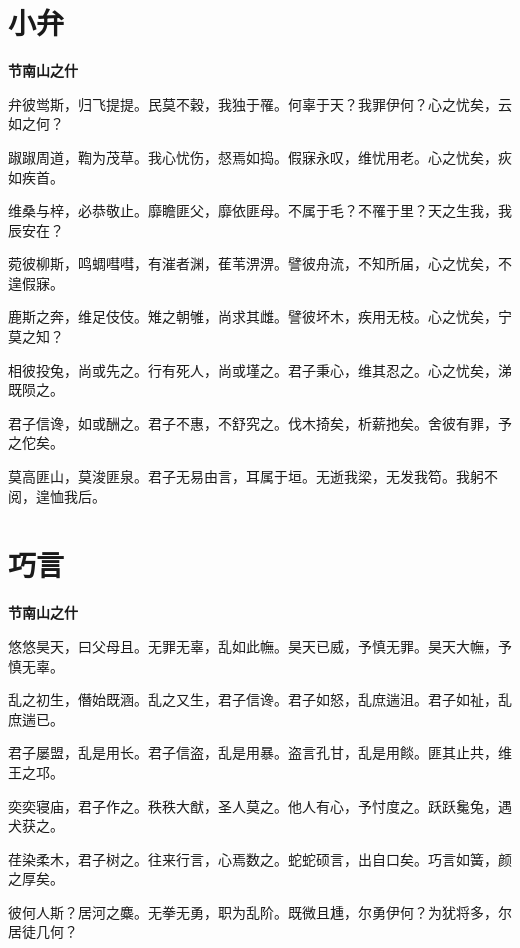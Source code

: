 \documentclass[12pt,a4paper]{ctexbook}
\begin{document}
\section{小弁}
\textbf{节南山之什}\par\vspace{0.5em}
弁彼鸴斯，归飞提提。民莫不穀，我独于罹。何辜于天？我罪伊何？心之忧矣，云如之何？\par
踧踧周道，鞫为茂草。我心忧伤，惄焉如捣。假寐永叹，维忧用老。心之忧矣，疢如疾首。\par
维桑与梓，必恭敬止。靡瞻匪父，靡依匪母。不属于毛？不罹于里？天之生我，我辰安在？\par
菀彼柳斯，鸣蜩嘒嘒，有漼者渊，萑苇淠淠。譬彼舟流，不知所届，心之忧矣，不遑假寐。\par
鹿斯之奔，维足伎伎。雉之朝雊，尚求其雌。譬彼坏木，疾用无枝。心之忧矣，宁莫之知？\par
相彼投兔，尚或先之。行有死人，尚或墐之。君子秉心，维其忍之。心之忧矣，涕既陨之。\par
君子信谗，如或酬之。君子不惠，不舒究之。伐木掎矣，析薪扡矣。舍彼有罪，予之佗矣。\par
莫高匪山，莫浚匪泉。君子无易由言，耳属于垣。无逝我梁，无发我笱。我躬不阅，遑恤我后。\par

\section{巧言}
\textbf{节南山之什}\par\vspace{0.5em}
悠悠昊天，曰父母且。无罪无辜，乱如此幠。昊天已威，予慎无罪。昊天大幠，予慎无辜。\par
乱之初生，僭始既涵。乱之又生，君子信谗。君子如怒，乱庶遄沮。君子如祉，乱庶遄已。\par
君子屡盟，乱是用长。君子信盗，乱是用暴。盗言孔甘，乱是用餤。匪其止共，维王之邛。\par
奕奕寝庙，君子作之。秩秩大猷，圣人莫之。他人有心，予忖度之。跃跃毚兔，遇犬获之。\par
荏染柔木，君子树之。往来行言，心焉数之。蛇蛇硕言，出自口矣。巧言如簧，颜之厚矣。\par
彼何人斯？居河之麋。无拳无勇，职为乱阶。既微且尰，尔勇伊何？为犹将多，尔居徒几何？\par
\end{document}
